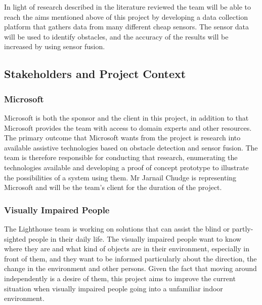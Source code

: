 \documentclass[prodmode,acmtosem]{acmsmall} %
\begin{document}
In light of research described in the literature reviewed the team will be able to reach the aims mentioned above of this project by developing a data collection platform that gathers data from many different cheap sensors. The sensor data will be used to identify obstacles, and the accuracy of the results will be increased by using sensor fusion.





\subsection{Stakeholders and Project Context}

\subsubsection{Microsoft}
Microsoft is both the sponsor and the client in this project, in addition to that Microsoft provides the team with access to domain experts and other resources. The primary outcome that Microsoft wants from the project is research into available assistive technologies based on obstacle detection and sensor fusion. The team is therefore responsible for conducting that research, enumerating the technologies available and developing a proof of concept prototype to illustrate the possibilities of a system using them.
Mr Jarnail Chudge is representing Microsoft and will be the team's client for the duration of the project.

\subsubsection{Visually Impaired People}
The Lighthouse team is working on solutions that can assist the blind or partly-sighted people in their daily life. The visually impaired people want to know where they are and what kind of objects are in their environment, especially in front of them, and they want to be informed particularly about the direction, the change in the environment and other persons. Given the fact that moving around independently is a desire of them, this project aims to improve the current situation when visually impaired people going into a unfamiliar indoor environment.
\end{document}
